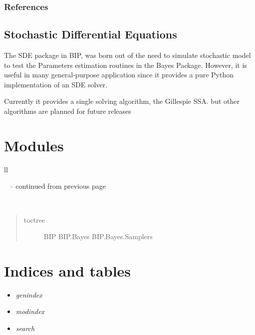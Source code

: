 \documentclass[a4paper,10pt,english]{sphinxmanual}
\begin{document}
\subsection{References}
\label{paramest:references}

\section{Stochastic Differential Equations}
\label{sde:stochastic-differential-equations}\label{sde:sde}\label{sde::doc}
The SDE package in BIP, was born out of the need to simulate stochastic model to test the Parameters estimation routines in the Bayes Package. However, it is useful in many general-purpose application since it provides a pure Python implementation of an SDE solver.

Currently it provides a single solving algorithm, the Gillespie SSA. but other algorithms are planned for future releases


\chapter{Modules}
\label{index:modules}
\begin{longtable}{ll}
\hline
\endfirsthead

%
{{\textsf{\tablename\ \thetable{} -- continued from previous page}}} \\
\hline
\endhead

\hline {} \\ \hline
\endfoot

\endlastfoot

\hline\end{longtable}

\begin{quote}\begin{description}
\item[{toctree}] \leavevmode
BIP
BIP.Bayes
BIP.Bayes.Samplers

\end{description}\end{quote}


\chapter{Indices and tables}
\label{index:indices-and-tables}\begin{itemize}
\item {} 
\emph{genindex}

\item {} 
\emph{modindex}

\item {} 
\emph{search}

\end{itemize}



\renewcommand{\indexname}{Index}
\printindex
\end{document}
